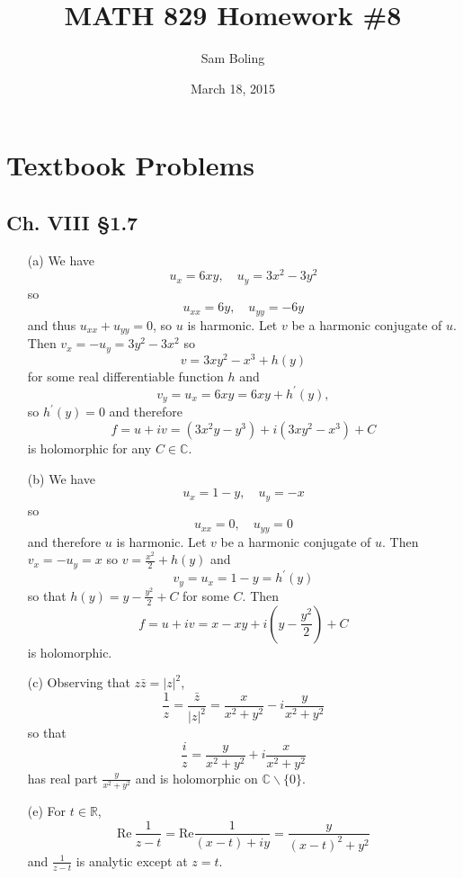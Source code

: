 \documentclass{article}
\title{MATH 829 Homework \#8}
\date{March 18, 2015}
\author{Sam Boling}
\newcounter{Problem}
\begin{document}
\begin{titlepage}
\maketitle
\end{titlepage}

\section{Textbook Problems}
\subsection*{Ch. VIII \S 1.7}
\begin{itemize}
  \item[(a)]{
    We have
    $$
    u_x = 6xy, \quad
    u_y = 3x^2 - 3y^2
    $$
    so
    $$
    u_{xx} = 6y, \quad
    u_{yy} = -6y
    $$
    and thus $u_{xx} + u_{yy} = 0$, so $u$ is harmonic. Let $v$
    be a harmonic conjugate of $u$. Then 
    $
    v_x = -u_y = 3y^2 - 3x^2
    $
    so 
    $$
    v = 3xy^2 - x^3 + h(y)
    $$
    for some real differentiable function $h$ and 
    $$
    v_y = u_x = 6xy = 6xy + h^\prime(y),
    $$
    so $h^\prime(y) = 0$ and therefore
    $$
    f = u + i v = (3x^2 y - y^3) + i (3xy^2 - x^3) + C
    $$
    is holomorphic for any $C \in \mathbb{C}$.
  }
  \item[(b)]{
    We have
    $$
    u_{x} = 1 - y, \quad
    u_{y} = -x
    $$
    so
    $$
    u_{xx} = 0, \quad
    u_{yy} = 0
    $$
    and therefore $u$ is harmonic.
    Let $v$ be a harmonic conjugate of $u$.
    Then
    $v_x = -u_y = x$
    so $v = \frac{x^2}{2} + h(y)$ and
    $$
    v_y = u_x = 1 - y = h^\prime(y)
    $$
    so that $h(y) = y - \frac{y^2}{2} + C$ for some $C$. Then
    $$
    f = u + i v = x - xy + i\left(y - \frac{y^2}{2}\right) + C
    $$
    is holomorphic.
  }
  \item[(c)]{
    Observing that $z \bar{z} = |z|^2$,
    $$
      \frac{1}{z} 
    = \frac{\bar{z}}{|z|^2} 
    = \frac{x}{x^2 + y^2} - i\frac{y}{x^2 + y^2}
    $$
    so that
    $$
      \frac{i}{z}
    = \frac{y}{x^2 + y^2} + i\frac{x}{x^2 + y^2}
    $$
    has real part $\frac{y}{x^2 + y^2}$ and is holomorphic on
    $\mathbb{C} \backslash \{ 0 \}$.
  }
  \item[(e)]{
    For $t \in \mathbb{R}$, 
    $$
      \mathrm{Re}~\frac{1}{z - t} 
    = \mathrm{Re}\frac{1}{(x - t) + iy} 
    = \frac{y}{(x - t)^2 + y^2}
    $$
    and $\frac{1}{z - t}$ is analytic except at $z = t$.
  }
\end{itemize}
\end{document}
